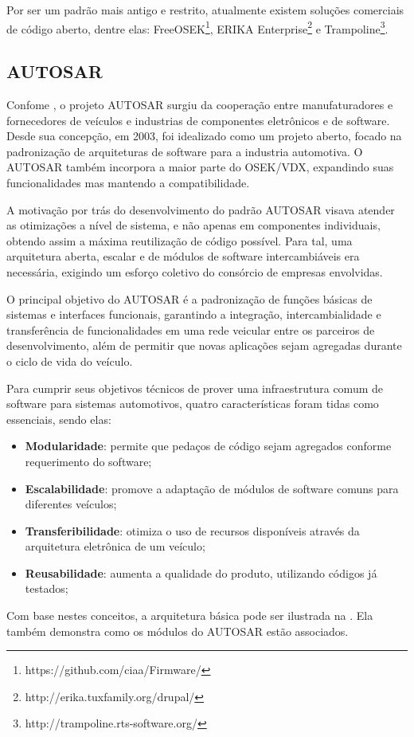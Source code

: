 Por ser um padrão mais antigo e restrito, atualmente existem soluções comerciais de código aberto, dentre elas: FreeOSEK\footnote{https://github.com/ciaa/Firmware/}, ERIKA Enterprise\footnote{http://erika.tuxfamily.org/drupal/} e Trampoline\footnote{http://trampoline.rts-software.org/}.

\subsection{AUTOSAR}

Confome , o projeto AUTOSAR surgiu da cooperação entre manufaturadores e fornecedores de veículos e industrias de componentes eletrônicos e de software. Desde sua concepção, em 2003, foi idealizado como um projeto aberto, focado na padronização de arquiteturas de software para a industria automotiva. O AUTOSAR também incorpora a maior parte do OSEK/VDX, expandindo suas funcionalidades mas mantendo a compatibilidade.

A motivação por trás do desenvolvimento do padrão AUTOSAR visava atender as otimizações a nível de sistema, e não apenas em componentes individuais, obtendo assim a máxima reutilização de código possível. Para tal, uma arquitetura aberta, escalar e de módulos de software intercambiáveis era necessária, exigindo um esforço coletivo do consórcio de empresas envolvidas.

O principal objetivo do AUTOSAR é a padronização de funções básicas de sistemas e interfaces funcionais, garantindo a integração, intercambialidade e transferência de funcionalidades em uma rede veicular entre os parceiros de desenvolvimento, além de permitir que novas aplicações sejam agregadas durante o ciclo de vida do veículo.


Para cumprir seus objetivos técnicos de prover uma infraestrutura comum de software para sistemas automotivos, quatro características foram tidas como essenciais, sendo elas:

\begin{itemize}
	\item \textbf{Modularidade}: permite que pedaços de código sejam agregados conforme requerimento do software;
	\item \textbf{Escalabilidade}: promove a adaptação de módulos de software comuns para diferentes veículos;
	\item \textbf{Transferibilidade}: otimiza o uso de recursos disponíveis através da arquitetura eletrônica de um veículo;
	\item \textbf{Reusabilidade}: aumenta a qualidade do produto, utilizando códigos já testados;
\end{itemize}

Com base nestes conceitos, a arquitetura básica pode ser ilustrada na . Ela também demonstra como os módulos do AUTOSAR estão associados.

